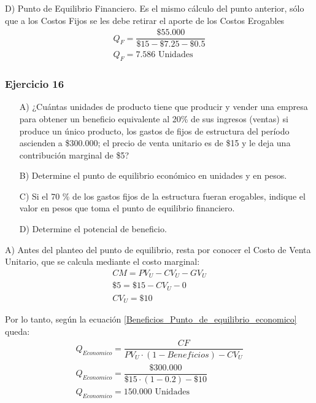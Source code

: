 \documentclass[12pt,a4paper]{article}
\begin{document}
        \hrulefill
        
        D) Punto de Equilibrio Financiero. Es el mismo cálculo del punto anterior, sólo que a los Costos Fijos se les debe retirar el aporte de los Costos Erogables
            \begin{gather*}
            	{Q}_{F} = \dfrac{ \$55{.}000 }{ \$15 - \$7.25 - \$0.5 } \\
                {Q}_{F} = 7{.}586 \text{ Unidades}
			\end{gather*}
        
    
    	\newpage
    
    	\subsubsection{Ejercicio 16}
        
        \begin{itemize}
			\item[A)]	¿Cuántas unidades de producto tiene que producir y vender una empresa para obtener un beneficio equivalente al 20\% de sus ingresos (ventas) si produce un único producto, los gastos de fijos de estructura del período ascienden a \$300.000; el precio de venta unitario es de \$15 y le deja una contribución marginal de \$5?
            \item[B)]	Determine el punto de equilibrio económico en unidades y en pesos.
            \item[C)]	Si el 70 \% de los gastos fijos de la estructura fueran erogables, indique el valor en pesos que toma el punto de equilibrio financiero.
            \item[D)]	Determine el potencial de beneficio.
		\end{itemize}
        
		A) Antes del planteo del punto de equilibrio, resta por conocer el Costo de Venta Unitario, que se calcula mediante el costo marginal:
            \begin{gather*}
            	{CM} = {PV}_{U} - {CV}_{U} - {GV}_{U} \\
                \$5 = \$15 - {CV}_{U} - 0 \\
                {CV}_{U} = \$10
			\end{gather*}
            \par{
            	Por lo tanto, según la ecuación \ref{Beneficios_Punto_de_equilibrio_economico} queda:
                }
            \begin{gather*}
                Q_{Economico} = \dfrac{CF}{ {PV}_{U} \cdot ( 1 - Beneficios ) - {CV}_{U} } \\
                Q_{Economico} = \dfrac{\$300{.}000}{ \$15 \cdot ( 1 - 0.2 ) - \$10 } \\
                Q_{Economico} = 150{.}000 \text{ Unidades}
            \end{gather*}
        
\end{document}
